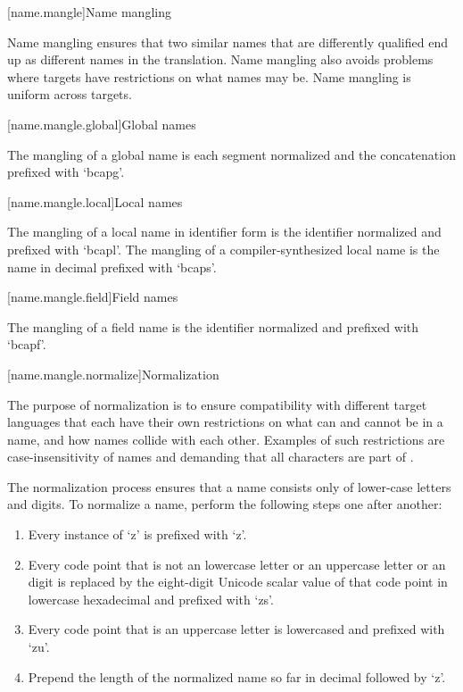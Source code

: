 [name.mangle]{Name mangling}

Name mangling ensures
that two similar names
that are differently qualified
end up as different names
in the translation.
Name mangling also
avoids problems
where targets
have restrictions
on what names may be.
Name mangling
is uniform
across targets.

[name.mangle.global]{Global names}

The mangling
of a global name
is each segment normalized
and the concatenation
prefixed with `bcapg'.

[name.mangle.local]{Local names}

The mangling
of a local name
in identifier form
is the identifier normalized
and prefixed with `bcapl'.
The mangling
of a compiler-synthesized local name
is the name in decimal
prefixed with `bcaps'.

[name.mangle.field]{Field names}

The mangling
of a field name
is the identifier normalized
and prefixed with `bcapf'.

[name.mangle.normalize]{Normalization}

The purpose of normalization is
to ensure compatibility
with different target languages
that each have their own restrictions
on what can and cannot be in a name, and
how names collide with each other.
Examples of such restrictions
are case-insensitivity of names
and demanding that all characters
are part of .

The normalization process
ensures that a name
consists only of
lower-case  letters
and  digits.
To normalize a name,
perform the following steps
one after another:

\begin{enumerate}
\item
    Every instance of `z'
    is prefixed with `z'.
\item
    Every code point that is
    not an  lowercase letter
    or an  uppercase letter
    or an  digit
    is replaced by the eight-digit Unicode scalar value
    of that code point
    in lowercase hexadecimal
    and prefixed with `zs'.
\item
    Every code point that is
    an  uppercase letter
    is lowercased
    and prefixed with `zu'.
\item
    Prepend the length
    of the normalized name so far
    in decimal
    followed by `z'.
\end{enumerate}
